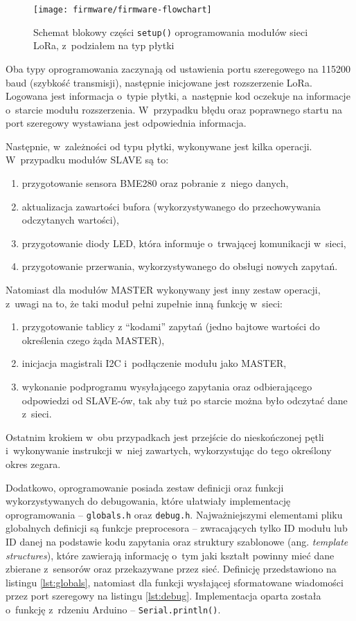 \begin{figure}[!htbp]
    \centering
    \texttt{[image: firmware/firmware-flowchart]}
    \caption{\label{img:firmware-flowchart}Schemat blokowy części \texttt{setup()} oprogramowania modułów sieci LoRa,
        z~podziałem na typ płytki}
\end{figure}

Oba typy oprogramowania zaczynają od ustawienia portu szeregowego na 115200 baud (szybkość transmisji), następnie
inicjowane jest rozszerzenie LoRa. Logowana jest informacja o~typie płytki, a~następnie kod oczekuje na informacje
o~starcie modułu rozszerzenia. W~przypadku błędu oraz poprawnego startu na port szeregowy wystawiana jest odpowiednia
informacja.

Następnie, w~zależności od typu płytki, wykonywane jest kilka operacji. W~przypadku modułów SLAVE są to:
\begin{enumerate}
    \item przygotowanie sensora BME280 oraz pobranie z~niego danych,
    \item aktualizacja zawartości bufora (wykorzystywanego do przechowywania odczytanych wartości),
    \item przygotowanie diody LED, która informuje o~trwającej komunikacji w~sieci,
    \item przygotowanie przerwania, wykorzystywanego do obsługi nowych zapytań.
\end{enumerate}

Natomiast dla modułów MASTER wykonywany jest inny zestaw operacji, z~uwagi na to, że taki moduł pełni zupełnie inną
funkcję w~sieci:
\begin{enumerate}
    \item przygotowanie tablicy z \enquote{kodami} zapytań (jedno bajtowe wartości do określenia czego żąda MASTER),
    \item inicjacja magistrali I2C i~podłączenie modułu jako MASTER,
    \item wykonanie podprogramu wysyłającego zapytania oraz odbierającego odpowiedzi od SLAVE-ów, tak aby tuż po
          starcie można było odczytać dane z~sieci.
\end{enumerate}
Ostatnim krokiem w~obu przypadkach jest przejście do nieskończonej pętli i~wykonywanie instrukcji w~niej zawartych,
wykorzystując do tego określony okres zegara.

Dodatkowo, oprogramowanie posiada zestaw definicji oraz funkcji wykorzystywanych do debugowania, które ułatwiały
implementację oprogramowania -- \texttt{globals.h} oraz \texttt{debug.h}. Najważniejszymi elementami pliku globalnych
definicji są funkcje preprocesora -- zwracających tylko ID modułu lub ID danej na podstawie kodu zapytania oraz
struktury szablonowe (ang. \textsl{template structures}), które zawierają informację o~tym jaki kształt powinny mieć
dane zbierane z~sensorów oraz przekazywane przez sieć. Definicję przedstawiono na listingu \ref{lst:globals}, natomiast
dla funkcji wysłającej sformatowane wiadomości przez port szeregowy na listingu \ref{lst:debug}. Implementacja oparta
została o~funkcję z~rdzeniu Arduino -- \texttt{Serial.println()}.

